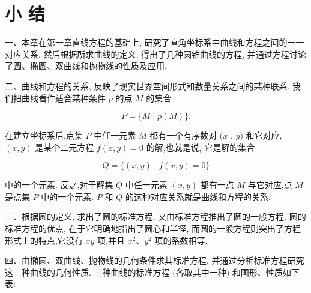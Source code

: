 \documentclass[lang=cn,newtx,12pt,scheme=chinese]{elegantbook}
\begin{document}
\chapter*{小 结}

一、本章在第一章直线方程的基础上, 研究了直角坐标系中曲线和方程之间的一一对应关系, 然后根据所求曲线的定义, 得出了几种圆锥曲线的方程, 并通过方程讨论了圆、椭圆、双曲线和抛物线的性质及应用.

二、曲线和方程的关系, 反映了现实世界空间形式和数量关系之间的某种联系. 我们把曲线看作适合某种条件 \(p\) 的点 \(M\) 的集合

\[
  P = \{ M \mid p\left( M\right) \} .
\]

在建立坐标系后,点集 \(P\) 中任一元素 \(M\) 都有一个有序数对 \((x\) , \(y)\) 和它对应, \(\left( {x,y}\right)\) 是某个二元方程 \(f\left( {x,y}\right) = 0\) 的解,也就是说, 它是解的集合

\[
  Q = \{ \left( {x,y}\right) \mid f\left( {x,y}\right) = 0\}
\]

中的一个元素. 反之,对于解集 \(Q\) 中任一元素 \(\left( {x,y}\right)\) 都有一点 \(M\) 与它对应,点 \(M\) 是点集 \(P\) 中的一个元素. \(P\) 和 \(Q\) 的这种对应关系就是曲线和方程的关系.

三、根据圆的定义, 求出了圆的标准方程, 又由标准方程推出了圆的一般方程. 圆的标准方程的优点, 在于它明确地指出了圆心和半径, 而圆的一般方程则突出了方程形式上的特点,它没有 \({xy}\) 项,并且 \({x}^{2}\text{、}{y}^{2}\) 项的系数相等.

四、由椭圆、双曲线、抛物线的几何条件求其标准方程, 并通过分析标准方程研究这三种曲线的几何性质. 三种曲线的标准方程 (各取其中一种) 和图形、性质如下表:
\end{document}
